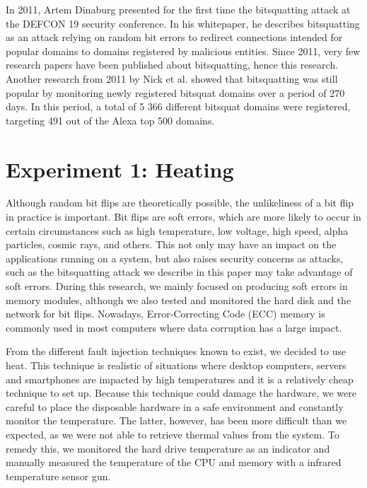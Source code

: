 \documentclass[conference]{IEEEtran}
\begin{document}
In 2011, Artem Dinaburg presented for the first time the bitsquatting attack at
the DEFCON 19 security conference. In his
whitepaper\cite{dinaburg2011bitsquatting}, he describes bitsquatting as an
attack relying on random bit errors to redirect connections intended for
popular domains to domains registered by malicious entities. Since 2011, very
few research papers have been published about bitsquatting, hence this
research. Another research from 2011 by Nick et
al.\cite{nikiforakis2013bitsquatting} showed that bitsquatting was still
popular by monitoring newly registered bitsquat domains over a period of
270 days. In this period, a total of 5 366 different bitsquat domains were
registered, targeting 491 out of the Alexa top 500 domains.

\section{Experiment 1: Heating}\label{sec:exp1}

Although random bit flips are theoretically possible, the unlikeliness of a bit
flip in practice is important. Bit flips are soft errors, which are more likely
to occur in certain circumstances such as high temperature, low voltage, high
speed, alpha particles, cosmic rays, and others. This not only may have an
impact on the applications running on a system, but also raises security
concerns as attacks, such as the bitsquatting attack we describe in this paper
may take advantage of soft errors. During this research, we mainly focused on
producing soft errors in memory modules, although we also tested and monitored
the hard disk and the network for bit flips. Nowadays, Error-Correcting Code
(ECC) memory is commonly used in most computers where data corruption has a
large impact.

From the different fault injection techniques known to
exist\cite{barenghi2012fault}, we decided to use heat. This technique is
realistic of situations where desktop computers, servers and smartphones are
impacted by high temperatures and it is a relatively cheap technique to set up.
Because this technique could damage the hardware, we were careful to place the
disposable hardware in a safe environment and constantly monitor the
temperature. The latter, however, has been more difficult than we expected, as
we were not able to retrieve thermal values from the system. To remedy this, we
monitored the hard drive temperature as an indicator and manually measured the
temperature of the CPU and memory with a infrared temperature sensor gun.
\end{document}
